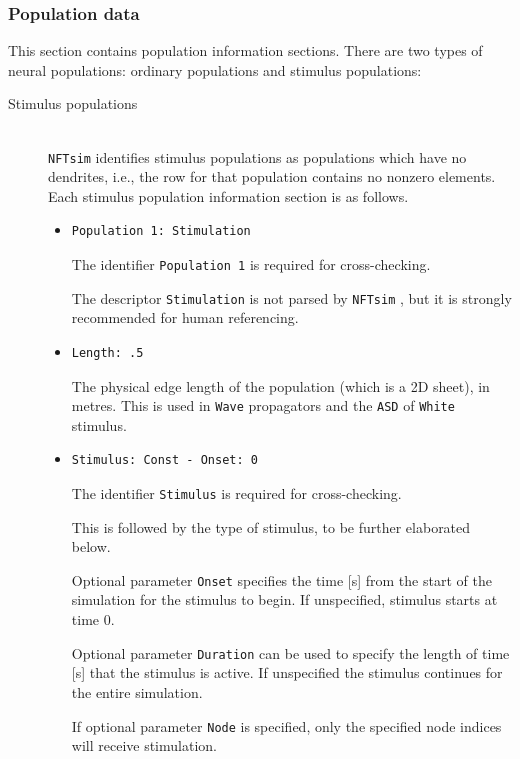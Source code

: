 \documentclass[12pt,a4paper]{article}
\newcommand{\type}[1]{{\small\small\tt #1} }
\newcommand{\NF}[0]{\type{NFTsim}}
\begin{document}
\subsubsection{Population data}
\label{sec:pop_conf}
This section contains population information sections. There are two types of neural populations: ordinary populations and stimulus populations:
\begin{description}

\item[Stimulus populations]\ \\

\NF identifies stimulus populations as populations which have no dendrites, i.e., the row for that population contains no nonzero elements.  Each stimulus population information section is as follows.
\begin{itemize}
    \item \begin{lstlisting}
Population 1: Stimulation
    \end{lstlisting}
    The identifier \type{Population 1} is required for cross-checking.

    The descriptor \type{Stimulation} is not parsed by \NF, but it is strongly recommended for human referencing.
    \item
    \begin{lstlisting}
Length: .5
    \end{lstlisting}
    The physical edge length of the population (which is a 2D sheet), in metres. This is used in \type{Wave} propagators and the \type{ASD} of \type{White} stimulus.
    \item
    \begin{lstlisting}
Stimulus: Const - Onset: 0
    \end{lstlisting}
    The identifier \type{Stimulus} is required for cross-checking.

    This is followed by the type of stimulus, to be further elaborated below.

    Optional parameter \type{Onset} specifies the time [s] from the start of the simulation for the stimulus to begin. If unspecified, stimulus starts at time 0.

    Optional parameter \type{Duration} can be used to specify the length of time [s] that the stimulus is active. If unspecified the stimulus continues for the entire simulation.

    If optional parameter \type{Node} is specified, only the specified node indices will receive stimulation.


\end{itemize}
\end{description}
\end{document}
